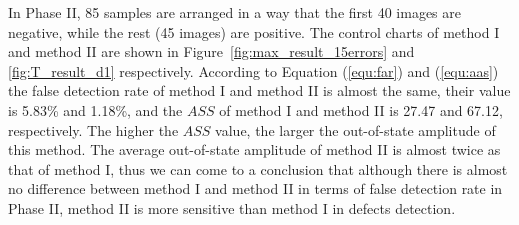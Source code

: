 In Phase II, 85 samples are arranged in a way that the first 40 images are negative, while the rest (45 images) are positive. The control charts of method I and method II are shown in Figure~\ref{fig:max_result_15errors} and \ref{fig:T_result_d1} respectively. According to Equation (\ref{equ:far}) and (\ref{equ:aas}) the false detection rate of method I and method II is almost the same, their value is 5.83\% and 1.18\%, and the $ASS$ of method I and method II is 27.47 and 67.12, respectively. The higher the $ASS$ value, the larger the out-of-state amplitude of this method. The average out-of-state amplitude of method II is almost twice as that of method I, thus we can come to a conclusion that although there is almost no difference between method I and method II in terms of false detection rate in Phase II, method II is more sensitive than method I in defects detection. 
